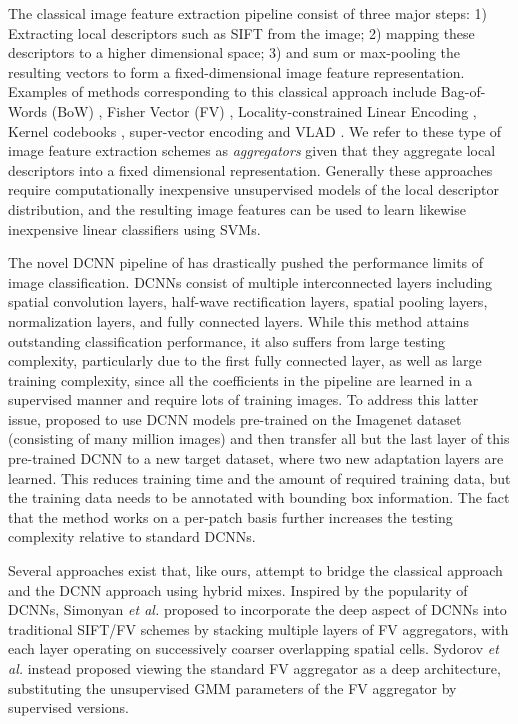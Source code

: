 \documentclass{article}
\begin{document}
The classical image feature extraction pipeline consist of three major steps: 1) Extracting local descriptors such as SIFT \cite{siftdescriptor} from the image; 2) mapping these descriptors to a higher dimensional space; 3) and sum or max-pooling the resulting vectors to form a fixed-dimensional image feature representation. Examples of methods corresponding to this classical approach include Bag-of-Words (BoW) \cite{csurka2004visual}, Fisher Vector (FV) \cite{perron}, Locality-constrained Linear Encoding \cite{Wang2010}, Kernel codebooks \cite{van2008kernel}, super-vector encoding \cite{zhou2010image} and VLAD \cite{Delhumeau2013}. We refer to these type of image feature extraction schemes as \emph{aggregators} given that they aggregate local descriptors into a fixed dimensional representation. Generally these approaches require computationally inexpensive unsupervised models of the local descriptor distribution, and the resulting image features can be used to learn likewise inexpensive linear classifiers using SVMs. %

The novel DCNN  pipeline of \cite{Krizhevsky2012} has drastically pushed the performance limits of image classification. DCNNs consist of multiple interconnected layers including spatial convolution layers, half-wave rectification layers, spatial pooling layers, normalization layers, and fully connected layers. While this method attains outstanding classification performance, it also suffers from large testing complexity, particularly due to the first fully connected layer, as well as large training complexity, since all the coefficients in the pipeline are learned in a supervised manner and require lots of training images. To address this latter issue, \cite{Oquaba} proposed to use DCNN models pre-trained on the Imagenet dataset (consisting of many million images) and then transfer all but the last layer of this pre-trained DCNN to a new target dataset, where two new adaptation layers are learned. This reduces training time and the amount of required training data, but the training data needs to be annotated with bounding box information. The fact that the method works on a per-patch basis further increases the testing complexity relative to standard DCNNs.

Several approaches exist that, like ours, attempt to bridge the classical approach and the DCNN approach using hybrid mixes. Inspired by the popularity of DCNNs, Simonyan \textit{et al.} \cite{simonyan2013deep} proposed to incorporate the deep aspect of DCNNs into traditional SIFT/FV schemes by stacking multiple layers of FV aggregators, with each layer operating on successively coarser overlapping spatial cells. Sydorov \textit{et al.} \cite{sydorovdeep} instead proposed viewing the standard FV aggregator as a deep architecture, substituting the unsupervised GMM parameters of the FV aggregator by supervised versions. 
\end{document}
